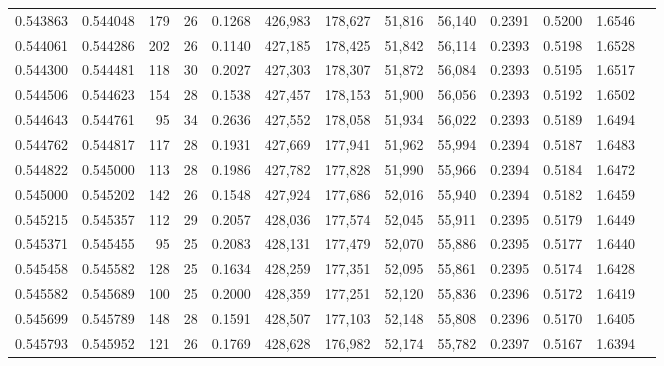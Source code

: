 \begin{tabular}{rrrrrrrrrrrrr}
0.543863 & 0.544048 &    179 &    26 &                                     0.1268 & 426,983 & 178,627 &  51,816 &  56,140 & 0.2391 & 0.5200 & 1.6546 \\
0.544061 & 0.544286 &    202 &    26 &                                     0.1140 & 427,185 & 178,425 &  51,842 &  56,114 & 0.2393 & 0.5198 & 1.6528 \\
0.544300 & 0.544481 &    118 &    30 &                                     0.2027 & 427,303 & 178,307 &  51,872 &  56,084 & 0.2393 & 0.5195 & 1.6517 \\
0.544506 & 0.544623 &    154 &    28 &                                     0.1538 & 427,457 & 178,153 &  51,900 &  56,056 & 0.2393 & 0.5192 & 1.6502 \\
0.544643 & 0.544761 &     95 &    34 &                                     0.2636 & 427,552 & 178,058 &  51,934 &  56,022 & 0.2393 & 0.5189 & 1.6494 \\
0.544762 & 0.544817 &    117 &    28 &                                     0.1931 & 427,669 & 177,941 &  51,962 &  55,994 & 0.2394 & 0.5187 & 1.6483 \\
0.544822 & 0.545000 &    113 &    28 &                                     0.1986 & 427,782 & 177,828 &  51,990 &  55,966 & 0.2394 & 0.5184 & 1.6472 \\
0.545000 & 0.545202 &    142 &    26 &                                     0.1548 & 427,924 & 177,686 &  52,016 &  55,940 & 0.2394 & 0.5182 & 1.6459 \\
0.545215 & 0.545357 &    112 &    29 &                                     0.2057 & 428,036 & 177,574 &  52,045 &  55,911 & 0.2395 & 0.5179 & 1.6449 \\
0.545371 & 0.545455 &     95 &    25 &                                     0.2083 & 428,131 & 177,479 &  52,070 &  55,886 & 0.2395 & 0.5177 & 1.6440 \\
0.545458 & 0.545582 &    128 &    25 &                                     0.1634 & 428,259 & 177,351 &  52,095 &  55,861 & 0.2395 & 0.5174 & 1.6428 \\
0.545582 & 0.545689 &    100 &    25 &                                     0.2000 & 428,359 & 177,251 &  52,120 &  55,836 & 0.2396 & 0.5172 & 1.6419 \\
0.545699 & 0.545789 &    148 &    28 &                                     0.1591 & 428,507 & 177,103 &  52,148 &  55,808 & 0.2396 & 0.5170 & 1.6405 \\
0.545793 & 0.545952 &    121 &    26 &                                     0.1769 & 428,628 & 176,982 &  52,174 &  55,782 & 0.2397 & 0.5167 & 1.6394 \\

\end{tabular}
